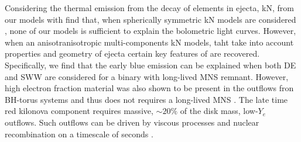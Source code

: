 Considering the thermal emission from the decay of \rproc{} elements in ejecta, \ac{kN}, 
from our models with find that, when spherically symmetric \ac{kN} models are 
considered \citep{Villar:2017wcc}, none of our models is sufficient to explain 
the \AT{} bolometric light curves.
However, when an anisotranisotropic multi-components \ac{kN} models, taht take into 
account properties and geometry of ejecta certain key features of \AT{} are recovered.
Specifically, we find that the early blue emission can be explained 
when both \ac{DE} and \ac{SWW} are considered for a binary with long-lived \ac{MNS} remnant.
However, high electron fraction material was also shown to be present in the outflows 
fron \ac{BH}-torus systems and thus does not requires a long-lived \ac{MNS} 
\citep{Fujibayashi:2020qda}.
The late time red kilonova component requires massive, ${\sim}20\%$ of the disk mass, 
low-$Y_e$ outflows. Such outflows can be driven by viscous processes and nuclear recombination 
on a timescale of seconds \citep[\eg][]{Metzger:2008av}.
%

